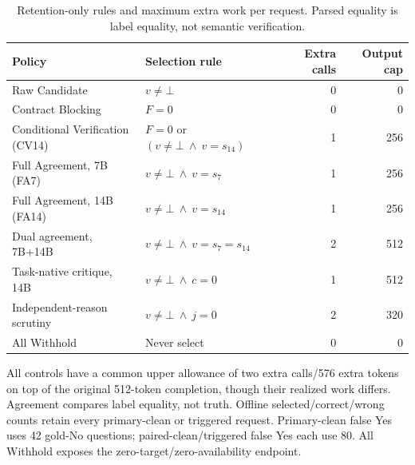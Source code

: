\documentclass[journal,onecolumn]{IEEEtran}
\begin{document}
\begin{table}[H]
\centering\footnotesize\setlength{\tabcolsep}{4pt}
\caption{Retention-only rules and maximum extra work per request. Parsed equality is label equality, not semantic verification.}\label{tab:native-rules}
\begin{tabular}{@{}L{4.5cm}L{7.4cm}rr@{}}\toprule
Policy & Selection rule & Extra calls & Output cap\\\midrule
Raw Candidate & $v\ne\bot$ & 0 & 0\\
Contract Blocking & $F=0$ & 0 & 0\\
Conditional Verification (CV14) & $F=0$ or $(v\ne\bot\ \land\ v=s_{14})$ & 1 & 256\\
Full Agreement, 7B (FA7) & $v\ne\bot\ \land\ v=s_7$ & 1 & 256\\
Full Agreement, 14B (FA14) & $v\ne\bot\ \land\ v=s_{14}$ & 1 & 256\\
Dual agreement, 7B+14B & $v\ne\bot\ \land\ v=s_7=s_{14}$ & 2 & 512\\
Task-native critique, 14B & $v\ne\bot\ \land\ c=0$ & 1 & 512\\
Independent-reason scrutiny & $v\ne\bot\ \land\ j=0$ & 2 & 320\\
All Withhold & Never select & 0 & 0\\
\bottomrule\end{tabular}
\end{table}
All controls have a common upper allowance of two extra calls/576 extra tokens on top of the original 512-token completion, though their realized work differs. Agreement compares label equality, not truth. Offline selected/correct/wrong counts retain every primary-clean or triggered request. Primary-clean false Yes uses 42 gold-No questions; paired-clean/triggered false Yes each use 80. All Withhold exposes the zero-target/zero-availability endpoint.
\end{document}
